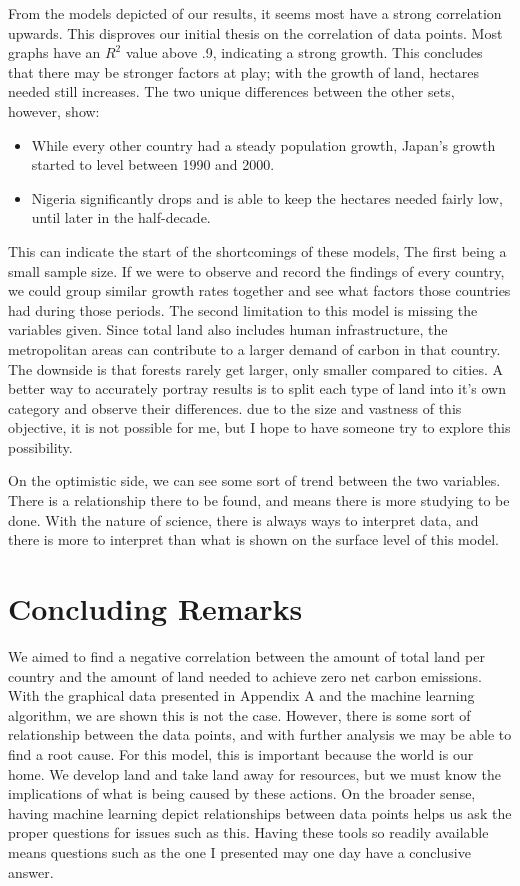 \documentclass[journal,onecolumn]{IEEEtran}
\begin{document}
From the models depicted of our results, it seems most have a strong correlation upwards. This disproves our initial thesis on the correlation of data points. Most graphs have an $R^2$ value above .9, indicating a strong growth. This concludes that there may be stronger factors at play; with the growth of land, hectares needed still increases. The two unique differences between the other sets, however, show:
\begin{itemize}
\item While every other country had a steady population growth, Japan's growth started to level between 1990 and 2000.
\item Nigeria significantly drops and is able to keep the hectares needed fairly low, until later in the half-decade.
\end{itemize}

This can indicate the start of the shortcomings of these models, The first being a small sample size. If we were to observe and record the findings of every country, we could group similar growth rates together and see what factors those countries had during those periods. The second limitation to this model is missing the variables given. Since total land also includes human infrastructure, the metropolitan areas can contribute to a larger demand of carbon in that country. The downside is that forests rarely get larger, only smaller compared to cities. A better way to accurately portray results is to split each type of land into it's own category and observe their differences. due to the size and vastness of this objective, it is not possible for me, but I hope to have someone try to explore this possibility.

\newline
On the optimistic side, we can see some sort of trend between the two variables. There is a relationship there to be found, and means there is more studying to be done. With the nature of science, there is always ways to interpret data, and there is more to interpret than what is shown on the surface level of this model.

\section{Concluding Remarks}

We aimed to find a negative correlation between the amount of total land per country and the amount of land needed to achieve zero net carbon emissions. With the graphical data presented in Appendix A and the machine learning algorithm, we are shown this is not the case. However, there is some sort of relationship between the data points, and with further analysis we may be able to find a root cause. For this model, this is important because the world is our home. We develop land and take land away for resources, but we must know the implications of what is being caused by these actions. On the broader sense, having machine learning depict relationships between data points helps us ask the proper questions for issues such as this. Having these tools so readily available means questions such as the one I presented may one day have a conclusive answer.
\end{document}
